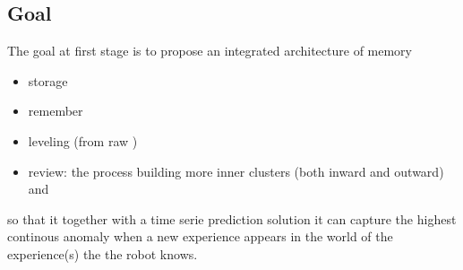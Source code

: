 \subsection{Goal}
The goal at first stage is to propose an integrated architecture of memory
\begin{itemize}
    \item storage
    \item remember
    \item leveling (from raw )
    \item review: the process building more inner clusters (both inward and outward) and
\end{itemize}
so that it together with a time serie prediction solution it can capture the highest continous anomaly when a new experience appears in the world of the experience(s) the the robot knows.